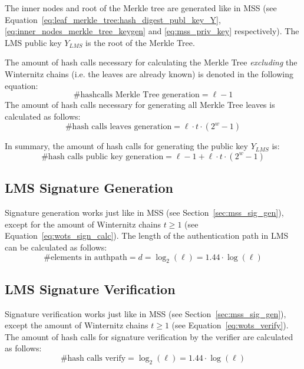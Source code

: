 The inner nodes and root of the Merkle tree are generated like in MSS (see Equation~\ref{eq:leaf_merkle_tree:hash_digest_publ_key_Y}, \ref{eq:inner_nodes_merkle_tree_keygen} and \ref{eq:mss_priv_key} respectively). The LMS public key $Y_{LMS}$ is the root of the Merkle Tree.

The amount of hash calls necessary for calculating the Merkle Tree \textit{excluding} the Winternitz chains (i.e. the leaves are already known) is denoted in the following equation:
\begin{equation}
\label{eq:lms_hashcalls_tree_treegen}
\text{\# hashcalls Merkle Tree generation} = \ell - 1
\end{equation}
The amount of hash calls necessary for generating all Merkle Tree leaves is calculated as follows:
\begin{equation}
\text{\# hash calls leaves generation} = \ell \cdot t \cdot (2^w-1)
\end{equation}

In summary, the amount of hash calls for generating the public key $Y_{LMS}$ is:
\begin{equation}
\text{\# hash calls public key generation} = \ell - 1 + \ell \cdot t \cdot (2^w-1)
\end{equation}

\subsection{LMS Signature Generation}
Signature generation works just like in MSS (see Section~\ref{sec:mss_sig_gen}), except for the amount of Winternitz chains $t \geq 1$ (see Equation~\ref{eq:wots_sign_calc}).
The length of the authentication path in LMS can be calculated as follows:
\begin{equation}
\label{eq:lms_authpath_el}
\text{\# elements in authpath} = d = \log_2(\ell) = 1.44 \cdot \log(\ell)
\end{equation}

\subsection{LMS Signature Verification}
Signature verification works just like in MSS (see Section~\ref{sec:mss_sig_gen}), except the amount of Winternitz chains $t \geq 1$ (see Equation~\ref{eq:wots_verify}).
The amount of hash calls for signature verification by the verifier are calculated as follows:
\begin{equation}
\label{eq:lms_hashcalls_verify}
\text{\# hash calls verify} = \log_2(\ell) = 1.44 \cdot \log(\ell)  
\end{equation}

